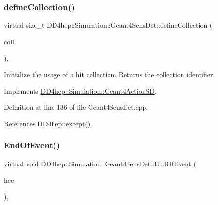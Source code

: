 \hypertarget{class_d_d4hep_1_1_simulation_1_1_geant4_sens_det_af75a2eab653115fffe05ccb32828a461}{}\label{class_d_d4hep_1_1_simulation_1_1_geant4_sens_det_af75a2eab653115fffe05ccb32828a461} 
\subsubsection{\texorpdfstring{define\+Collection()}{defineCollection()}}
{\footnotesize\ttfamily virtual size\+\_\+t D\+D4hep\+::\+Simulation\+::\+Geant4\+Sens\+Det\+::define\+Collection (\begin{DoxyParamCaption}\item[{const std\+::string \&}]{coll }\end{DoxyParamCaption})\hspace{0.3cm}{\ttfamily [inline]}, {\ttfamily [virtual]}}



Initialize the usage of a hit collection. Returns the collection identifier. 



Implements \hyperlink{class_d_d4hep_1_1_simulation_1_1_geant4_action_s_d_acb227bd17a6f30d5df564a4d19f3f8a2}{D\+D4hep\+::\+Simulation\+::\+Geant4\+Action\+SD}.



Definition at line 136 of file Geant4\+Sens\+Det.\+cpp.



References D\+D4hep\+::except().

\hypertarget{class_d_d4hep_1_1_simulation_1_1_geant4_sens_det_a37c49991840451bda97aa4640fcd1b4c}{}\label{class_d_d4hep_1_1_simulation_1_1_geant4_sens_det_a37c49991840451bda97aa4640fcd1b4c} 
\subsubsection{\texorpdfstring{End\+Of\+Event()}{EndOfEvent()}}
{\footnotesize\ttfamily virtual void D\+D4hep\+::\+Simulation\+::\+Geant4\+Sens\+Det\+::\+End\+Of\+Event (\begin{DoxyParamCaption}\item[{G4\+H\+Cof\+This\+Event $\ast$}]{hce }\end{DoxyParamCaption})\hspace{0.3cm}{\ttfamily [inline]}, {\ttfamily [virtual]}}



